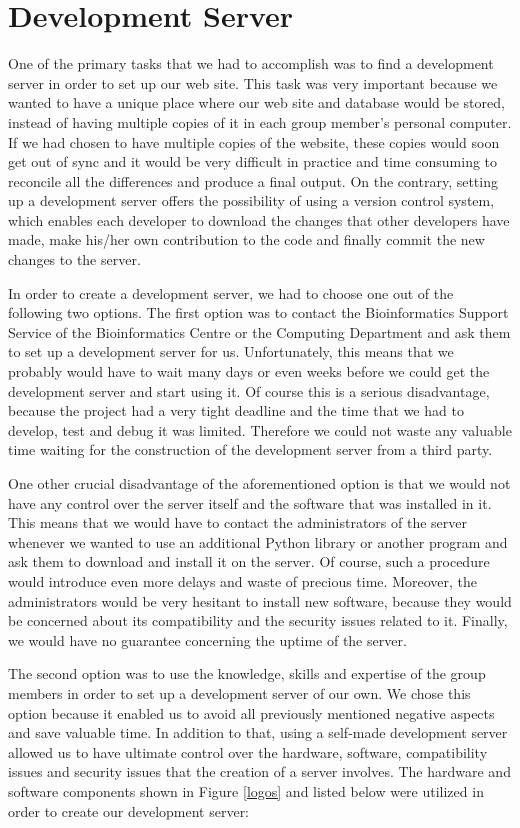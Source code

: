 \section{Development Server}
One of the primary tasks that we had to accomplish was to find a development server in order to set up our web site.
This task was very important because we wanted to have a unique place where our web site and database would be stored, instead of having multiple copies of it in each group member's personal computer.
If we had chosen to have multiple copies of the website, these copies would soon get out of sync and it would be very difficult in practice and time consuming to reconcile all the differences and produce a final output.
On the contrary, setting up a development server offers the possibility of using a version control system, which enables each developer to download the changes that other developers have made, make his/her own contribution to the code and finally commit the new changes to the server.

In order to create a development server, we had to choose one out of the following two options.
The first option was to contact the Bioinformatics Support Service of the Bioinformatics Centre or the Computing Department and ask them to set up a development server for us.
Unfortunately, this means that we probably would have to wait many days or even weeks before we could get the development server and start using it.
Of course this is a serious disadvantage, because the project had a very tight deadline and the time that we had to develop, test and debug it was limited.
Therefore we could not waste any valuable time waiting for the construction of the development server from a third party.

One other crucial disadvantage of the aforementioned option is that we would not have any control over the server itself and the software that was installed in it.
This means that we would have to contact the administrators of the server whenever we wanted to use an additional Python library or another program and ask them to download and install it on the server.
Of course, such a procedure would introduce even more delays and waste of precious time.
Moreover, the administrators would be very hesitant to install new software, because they would be concerned about its compatibility and the security issues related to it.
Finally, we would have no guarantee concerning the uptime of the server.

The second option was to use the knowledge, skills and expertise of the group members in order to set up a development server of our own.
We chose this option because it enabled us to avoid all previously mentioned negative aspects and save valuable time.
In addition to that, using a self-made development server allowed us to have ultimate control over the hardware, software, compatibility issues and security issues that the creation of a server involves.
The hardware and software components shown in Figure \ref{logos} and listed below were utilized in order to create our development server:


